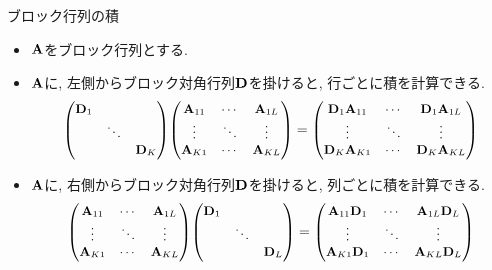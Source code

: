 \documentclass[dvipdfmx,notheorems,t]{beamer}
\begin{document}
\begin{frame}{ブロック行列の積}
\begin{itemize}
  \item $\vb{A}$をブロック行列とする.
  \item $\vb{A}$に, 左側からブロック対角行列$\vb{D}$を掛けると, 行ごとに積を計算できる.
  \begin{align*}
    \small
    \mqty(\dmat{\vb{D}_1, \ddots, \vb{D}_K})
      \mqty(\vb{A}_{11} & \cdots & \vb{A}_{1L} \\
        \vdots & \ddots & \vdots \\
        \vb{A}_{K1} & \cdots & \vb{A}_{KL})
      = \mqty(\vb{D}_1 \vb{A}_{11} & \cdots & \vb{D}_1 \vb{A}_{1L} \\
        \vdots & \ddots & \vdots \\
        \vb{D}_K \vb{A}_{K1} & \cdots & \vb{D}_K \vb{A}_{KL})
  \end{align*}
  \item $\vb{A}$に, 右側からブロック対角行列$\vb{D}$を掛けると, 列ごとに積を計算できる.
  \begin{align*}
    \small
    \mqty(\vb{A}_{11} & \cdots & \vb{A}_{1L} \\
        \vdots & \ddots & \vdots \\
        \vb{A}_{K1} & \cdots & \vb{A}_{KL})
        \mqty(\dmat{\vb{D}_1, \ddots, \vb{D}_L})
      = \mqty(\vb{A}_{11} \vb{D}_1 & \cdots & \vb{A}_{1L} \vb{D}_L \\
        \vdots & \ddots & \vdots \\
        \vb{A}_{K1} \vb{D}_1 & \cdots & \vb{A}_{KL} \vb{D}_L)
  \end{align*}
\end{itemize}
\end{frame}
\end{document}
